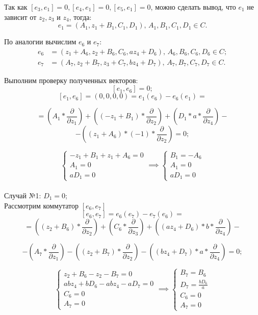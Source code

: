 \documentclass[12pt]{article}
\begin{document}
Так как $[e_3,e_1] = 0, [e_4,e_1] = 0, [e_5,e_1] = 0$, можно сделать вывод, что $e_1$ не зависит от $z_2, z_3 \text{ и } z_4$, тогда: 
$$e_1 = (A_1, z_1 + B_1, C_1, D_1), \, A_1, B_1, C_1, D_1 \in C.$$ 

По аналогии вычислим $e_6 \text{ и } e_7$:
\begin{align*}
e_6 &= (z_1 + A_6, z_2 + B_6, C_6, az_4 + D_6), \, A_6, B_6, C_6, D_6 \in C; \\
e_7 &= (A_7, z_2 + B_7, z_3 + C_7, bz_4 + D_7), \, A_7, B_7, C_7, D_7 \in C.
\end{align*}

Выполним проверку полученных векторов:
\[
[e_1, e_6] = 0;
\]
\[
[e_1, e_6] = (0, 0, 0, 0) = e_1(e_6) - e_6(e_1) = 
\]

\[
= \left(A_1 * \frac{\partial}{\partial z_1}\right)
+ \left((-z_1 + B_1) * \frac{\partial}{\partial z_2}\right)
+ \left(D_1 * a * \frac{\partial}{\partial z_4}\right) -
\]
\[
- \left((z_1 + A_6) * (-1) * \frac{\partial}{\partial z_2}\right) = 0;
\]

\[
\begin{cases}
-z_1 + B_1 + z_1 + A_6 = 0 \\
A_1 = 0 \\
aD_1 = 0
\end{cases}
\implies
\begin{cases}
B_1 = -A_6 \\
A_1 = 0 \\
aD_1 = 0
\end{cases}
\]\\

Случай №1: $D_1 = 0$; \\
Рассмотрим коммутатор $[e_6, e_7]$
\[
[e_6, e_7] = e_6(e_7) - e_7(e_6) = 
\]
\[
= \left((z_2 + B_6) * \frac{\partial}{\partial z_2}\right)
+ \left(C_6 * \frac{\partial}{\partial z_3}\right)
+ \left((az_4 + D_6) * b * \frac{\partial}{\partial z_4}\right) - 
\]

\[
- \left(A_7 * \frac{\partial}{\partial z_1}\right)
- \left((z_2 + B_7) * \frac{\partial}{\partial z_2}\right)
- \left((bz_4 + D_7) * a * \frac{\partial}{\partial z_4}\right) = 0;
\]

\[
\begin{cases}
z_2 + B_6 - z_2 - B_7 = 0 \\
abz_4 + bD_6 - abz_4 - aD_7 = 0 \\
C_6 = 0 \\
A_7 = 0
\end{cases}
\implies
\begin{cases}
B_7 = B_6 \\
D_7 = \frac{bD_6}{a} \\
C_6 = 0 \\
A_7 = 0
\end{cases}
\]\\
\end{document}
